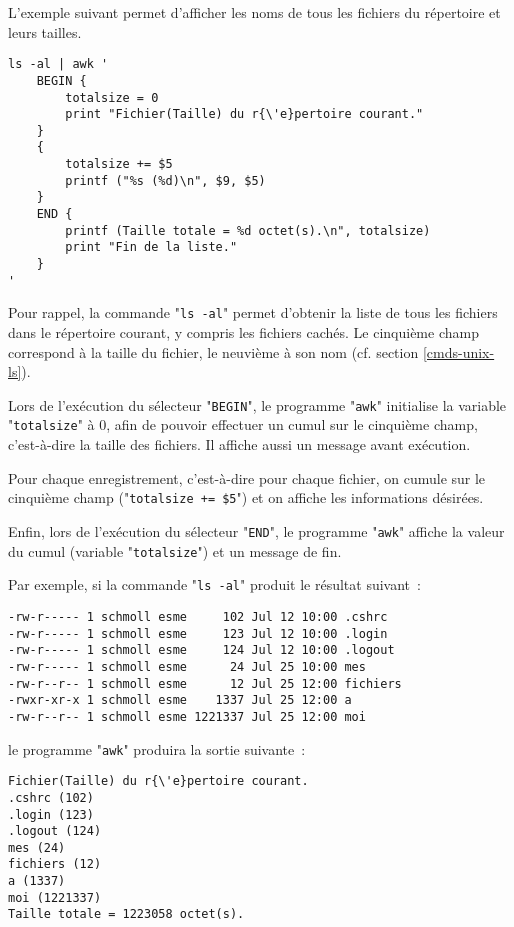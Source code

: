 \begin{example}
L'exemple suivant permet d'afficher les noms de tous les fichiers du
r{\'e}pertoire et leurs tailles.
\begin{verbatim}
ls -al | awk '
    BEGIN {
        totalsize = 0
        print "Fichier(Taille) du r{\'e}pertoire courant."
    }
    {
        totalsize += $5
        printf ("%s (%d)\n", $9, $5)
    }
    END {
        printf (Taille totale = %d octet(s).\n", totalsize)
        print "Fin de la liste."
    }
'
\end{verbatim}

Pour rappel, la commande "\texttt{ls -al}" permet d'obtenir la liste de
tous les fichiers dans le r{\'e}pertoire courant, y compris les fichiers
cach{\'e}s. Le cinqui{\`e}me champ correspond {\`a} la taille du fichier, le neuvi{\`e}me
{\`a} son nom (cf. section \ref{cmds-unix-ls}).

Lors de l'ex{\'e}cution du s{\'e}lecteur "\texttt{BEGIN}", le programme
"\texttt{awk}" initialise la variable "\texttt{totalsize}" {\`a} $0$,
afin de pouvoir effectuer un cumul sur le cinqui{\`e}me champ, c'est-{\`a}-dire
la taille des fichiers. Il affiche aussi un message avant ex{\'e}cution.

Pour chaque enregistrement, c'est-{\`a}-dire pour chaque fichier,
on cumule sur le cinqui{\`e}me champ ("\verb,totalsize += $5,")
et on affiche les informations d{\'e}sir{\'e}es.

Enfin, lors de l'ex{\'e}cution du s{\'e}lecteur "\texttt{END}", le
programme "\texttt{awk}" affiche la valeur du cumul (variable
"\texttt{totalsize}") et un message de fin.

Par exemple, si la commande "\texttt{ls -al}" produit le r{\'e}sultat
suivant~:
\begin{verbatim}
-rw-r----- 1 schmoll esme     102 Jul 12 10:00 .cshrc
-rw-r----- 1 schmoll esme     123 Jul 12 10:00 .login
-rw-r----- 1 schmoll esme     124 Jul 12 10:00 .logout
-rw-r----- 1 schmoll esme      24 Jul 25 10:00 mes
-rw-r--r-- 1 schmoll esme      12 Jul 25 12:00 fichiers
-rwxr-xr-x 1 schmoll esme    1337 Jul 25 12:00 a
-rw-r--r-- 1 schmoll esme 1221337 Jul 25 12:00 moi
\end{verbatim}
le programme "\texttt{awk}" produira la sortie suivante~:
\begin{verbatim}
Fichier(Taille) du r{\'e}pertoire courant.
.cshrc (102)
.login (123)
.logout (124)
mes (24)
fichiers (12)
a (1337)
moi (1221337)
Taille totale = 1223058 octet(s).
\end{verbatim}
\end{example}


